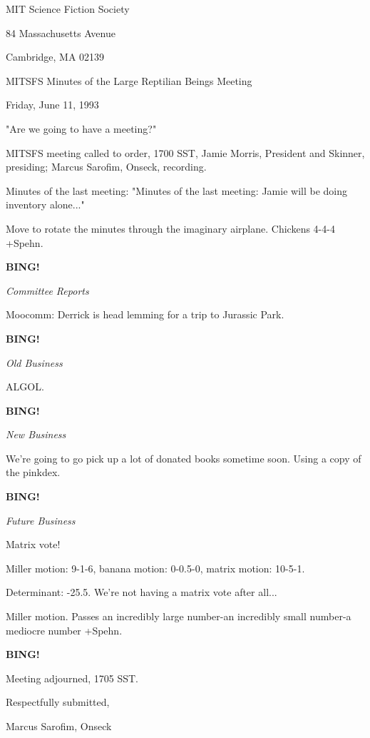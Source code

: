 \documentclass[12pt]{article}
\newcommand{\bing}{{\bf BING!} }
\newcommand{\goto}[1]{\bing \vskip 12pt \centerline{{\em{#1}}}}
\begin{document}
\begin{center}

MIT Science Fiction Society 

84 Massachusetts Avenue

Cambridge, MA 02139

\vspace{12pt}

MITSFS Minutes of the Large Reptilian Beings Meeting

Friday, June 11, 1993

\end{center}
 
\vspace{18pt}

\setlength{\parskip}{6pt}

\noindent
"Are we going to have a meeting?"

MITSFS meeting called to order, 1700 SST,
Jamie Morris, President and Skinner, presiding; Marcus Sarofim, Onseck, recording.

Minutes of the last meeting: "Minutes of the last meeting: Jamie will be doing inventory alone..."

Move to rotate the minutes through the imaginary airplane. Chickens 4-4-4 +Spehn.

\goto{Committee Reports}

Moocomm: Derrick is head lemming for a trip to Jurassic Park.

\goto{Old Business}

ALGOL.

\goto{New Business}

We're going to go pick up a lot of donated books sometime soon. Using a copy of the pinkdex.

\goto{Future Business}

Matrix vote!

Miller motion: 9-1-6, banana motion: 0-0.5-0, matrix motion: 10-5-1.

Determinant: -25.5. We're not having a matrix vote after all...

Miller motion. Passes an incredibly large number-an incredibly small number-a mediocre number +Spehn.

\bing

\vspace{12pt}

\noindent
Meeting adjourned, 1705 SST.

\vspace{18pt}

\centerline{Respectfully submitted,}
\centerline{Marcus Sarofim, Onseck}
\end{document}

